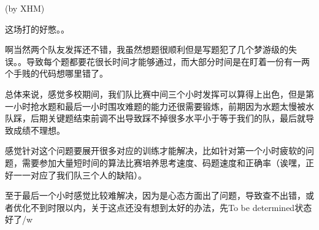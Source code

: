 \documentclass[a4paper, 11pt, nofonts, nocap, fancyhdr]{ctexart}
\begin{document}
(by XHM) 

这场打的好憋。。

啊当然两个队友发挥还不错，我虽然想题很顺利但是写题犯了几个梦游级的失误。。导致每个题都要花很长时间才能够通过，而大部分时间是在盯着一份有一两个手贱的代码想哪里错了。

总体来说，感觉多校期间，我们队比赛中间三个小时发挥可以算得上出色，但是第一小时抢水题和最后一小时围攻难题的能力还很需要锻炼，前期因为水题太慢被水队踩，后期关键题结束前调不出导致踩不掉很多水平小于等于我们的队，最后就导致成绩不理想。

感觉针对这个问题要展开很多对应的训练才能解决，比如针对第一个小时疲软的问题，需要参加大量短时间的算法比赛培养思考速度、码题速度和正确率（诶嘿，正好一一对应了我们队三个人的缺陷）。

至于最后一个小时感觉比较难解决，因为是心态方面出了问题，导致查不出错，或者优化不到时限以内，关于这点还没有想到太好的办法，先To be determined状态好了/w\
\end{document}
